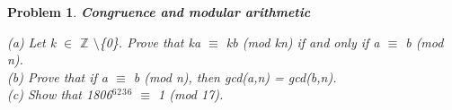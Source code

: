 \documentclass{article}
\newtheorem{problem}{Problem}
\theoremstyle{definition}
\begin{document}
\begin{problem}
\textbf{Congruence and modular arithmetic}

(a) Let k \(\in\) \(\mathbb{Z}\) \(\setminus\)\{0\}. Prove that ka \(\equiv\) kb (mod kn) if and only if a \(\equiv\) b (mod n).\\

(b) Prove that if a \(\equiv\) b (mod n), then gcd(a,n) = gcd(b,n).\\

(c) Show that 1806\(^6\)\(^2\)\(^3\)\(^6\) \(\equiv\) 1 (mod 17).\\


\end{problem}
\end{document}
